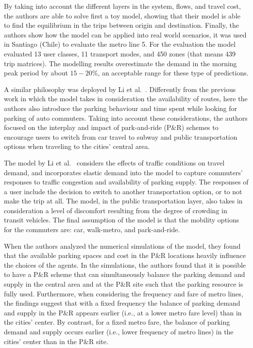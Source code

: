 By taking into account the different layers in the system, flows, and travel cost, the authors are able to solve first a toy model, showing that their model is able to find the equilibrium in the trips between origin and destination. Finally, the authors show how the model can be applied into real world scenarios, it was used in Santiago (Chile) to evaluate the metro line 5. For the evaluation the model evaluated 13 user classes, 11 transport modes, and 450 zones (that means 439 trip matrices). The modelling results overestimate the demand in the morning peak period by about $15-20\%$, an acceptable range for these type of predictions.

A similar philosophy was deployed by Li et al.~\cite{li2007parkride}. Differently from the previous work in which the model takes in consideration the availability of routes, here the authors also introduce the parking behaviour and time spent while looking for parking of auto commuters. Taking into account these considerations, the authors focused on the interplay and impact of park-and-ride (P\&R) schemes to encourage users to switch from car travel to subway and public transportation options when traveling to the cities' central area. 

The model by Li et al.~\cite{li2007parkride} considers the effects of traffic conditions on travel demand, and incorporates elastic demand into the model to capture commuters’ responses to traffic congestion and availability of parking supply. The responses of a user include the decision to switch to another transportation option, or to not make the trip at all. The model, in the public transportation layer, also takes in consideration a level of discomfort resulting from the degree of crowding in transit vehicles. The final assumption of the model is that the mobility options for the commuters are: car, walk-metro, and park-and-ride.

When the authors analyzed the numerical simulations of the model, they found that the available parking spaces and cost in the P\&R locations heavily influence the choices of the agents. In the simulations, the authors found that it is possible to have a P\&R scheme that can simultaneously balance the parking demand and supply in the central area and at the P\&R site such that the parking resource is fully used. Furthermore, when considering the frequency and fare of metro lines, the findings suggest that with a fixed frequency the balance of parking demand and supply in the P\&R appears earlier (i.e., at a lower metro fare level) than in the cities' center. By contrast, for a fixed metro fare, the balance of parking demand and supply occurs earlier (i.e., lower frequency of metro lines) in the cities' center than in the P\&R site. 

